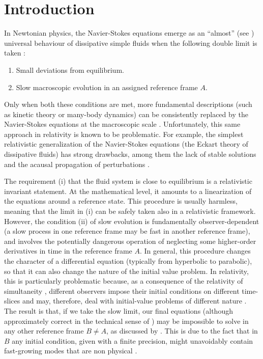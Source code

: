 \documentclass[a4paper, amsfonts, amssymb, amsmath, reprint, twocolumn, showkeys, nofootinbib]{revtex4-2}
\begin{document}
\maketitle
 

\section{Introduction} 

In Newtonian physics, the Navier-Stokes equations emerge as an ``almost'' (see \cite{jain_kovtun_2020arXiv}) universal behaviour of dissipative simple fluids when the following double limit is taken \citep{huang_book}: 
\begin{enumerate}
\item[i-] Small deviations from equilibrium.
\item[ii-] Slow macroscopic evolution in an assigned reference frame $A$.
\end{enumerate}
Only when both these conditions are met, more fundamental descriptions (such as kinetic theory or many-body dynamics) can be consistently replaced by the Navier-Stokes equations at the macroscopic scale \cite{KADANOFF1963}. Unfortunately, this same approach in relativity is known to be problematic. For example, the simplest relativistic generalization of the Navier-Stokes equations (the Eckart theory of dissipative fluids) has strong drawbacks, among them the lack of stable solutions and the acausal propagation of perturbations \citep{Hishcock1983,Hiscock_Insatibility_first_order}.  

The requirement (i) that the fluid system is close to equilibrium is a relativistic invariant statement. At the mathematical level, it amounts to a linearization of the equations around a reference state.
This procedure is usually harmless, meaning that the limit in (i) can be safely taken also in a relativistic framework. 
However, the condition (ii) of slow evolution is fundamentally observer-dependent (a slow process in one reference frame may be fast in another reference frame), and involves the potentially dangerous operation of neglecting some higher-order derivatives in time in the reference frame $A$.
In general, this procedure changes the character of a differential equation (typically from hyperbolic to parabolic), so that it can also change the nature of the initial value problem. 
In relativity, this is particularly problematic because, as a consequence of the relativity of simultaneity \citep{special_in_gen}, different observers impose their initial conditions on different time-slices and may, therefore, deal with initial-value problems of different nature \citep{GavassinoLyapunov_2020}. 
The result is that, if we take the slow limit, our final equations (although approximately correct in the technical sense of \citet{Geroch95}) may be impossible to solve in any other reference frame $B \neq A$, as discussed by \citet{Kost2000}. 
This is due to the fact that in $B$ any initial condition, given with a finite precision, might unavoidably contain fast-growing  modes that are non physical \citep{Hiscock_Insatibility_first_order}.
\end{document}
